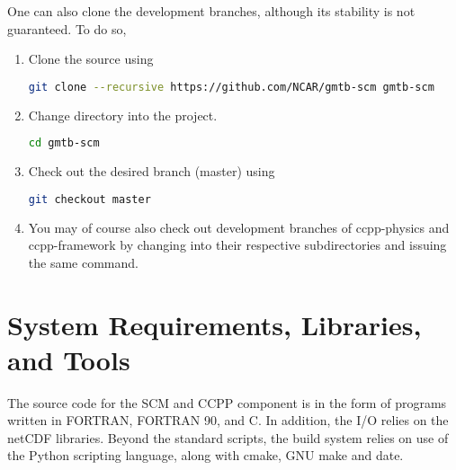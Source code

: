 One can also clone the development branches, although its stability is not guaranteed. To do so,
\begin{enumerate}
    \item Clone the source using
\begin{lstlisting}[language=bash]
git clone --recursive https://github.com/NCAR/gmtb-scm gmtb-scm
\end{lstlisting}
\item Change directory into the project.
\begin{lstlisting}[language=bash]
cd gmtb-scm
\end{lstlisting}
\item Check out the desired branch (master) using
\begin{lstlisting}[language=bash]
git checkout master
\end{lstlisting}
\item You may of course also check out development branches of ccpp-physics and ccpp-framework by changing into their respective subdirectories and issuing the same  command.
\end{enumerate}


\section{System Requirements, Libraries, and Tools}
\label{section: systemrequirements}

The source code for the SCM and CCPP component is in the form of programs written in FORTRAN, FORTRAN 90, and C. In addition, the I/O relies on the netCDF libraries. Beyond the standard scripts, the build system relies on use of the Python scripting language, along with cmake, GNU make and date.


